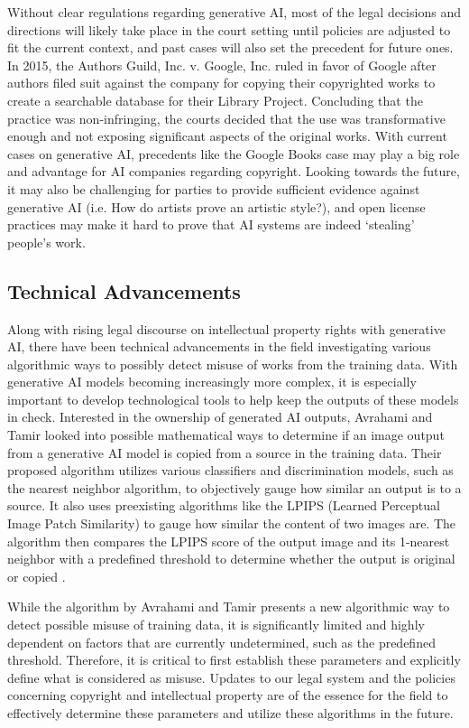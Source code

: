 \documentclass[manuscript,screen]{acmart}
\begin{document}
Without clear regulations regarding generative AI, most of the legal decisions and directions will likely take place in the court setting until policies are adjusted to fit the current context, and past cases will also set the precedent for future ones. In 2015, the Authors Guild, Inc. v. Google, Inc. ruled in favor of Google after authors filed suit against the company for copying their copyrighted works to create a searchable database for their Library Project. Concluding that the practice was non-infringing, the courts decided that the use was transformative enough and not exposing significant aspects of the original works. With current cases on generative AI, precedents like the Google Books case may play a big role and advantage for AI companies regarding copyright. Looking towards the future, it may also be challenging for parties to provide sufficient evidence against generative AI (i.e. How do artists prove an artistic style?), and open license practices may make it hard to prove that AI systems are indeed `stealing' people’s work. \cite{PAPER:10}  

\subsection{Technical Advancements}
Along with rising legal discourse on intellectual property rights with generative AI, there have been technical advancements in the field investigating various algorithmic ways to possibly detect misuse of works from the training data. With generative AI models becoming increasingly more complex, it is especially important to develop technological tools to help keep the outputs of these models in check. Interested in the ownership of generated AI outputs, Avrahami and Tamir looked into possible mathematical ways to determine if an image output from a generative AI model is copied from a source in the training data. Their proposed algorithm utilizes various classifiers and discrimination models, such as the nearest neighbor algorithm, to objectively gauge how similar an output is to a source. It also uses preexisting algorithms like the LPIPS (Learned Perceptual Image Patch Similarity) to gauge how similar the content of two images are. The algorithm then compares the LPIPS score of the output image and its 1-nearest neighbor with a predefined threshold to determine whether the output is original or copied \cite{PAPER:11}.

While the algorithm by Avrahami and Tamir presents a new algorithmic way to detect possible misuse of training data, it is significantly limited and highly dependent on factors that are currently undetermined, such as the predefined threshold. Therefore, it is critical to first establish these parameters and explicitly define what is considered as misuse. Updates to our legal system and the policies concerning copyright and intellectual property are of the essence for the field to effectively determine these parameters and utilize these algorithms in the future. 
\end{document}
